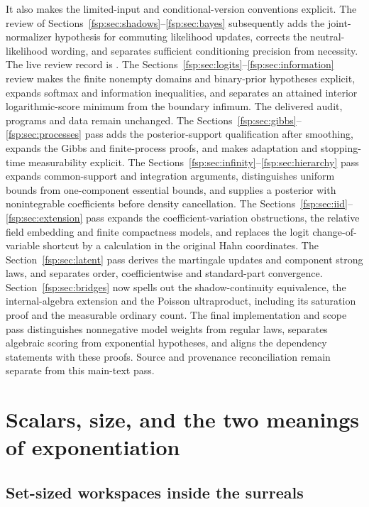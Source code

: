 \documentclass[11pt,a4paper]{article}
\numberwithin{equation}{section}
\theoremstyle{definition}
\theoremstyle{remark}
\begin{document}
It also makes the limited-input and conditional-version conventions explicit.
The review of Sections~\ref{fsp:sec:shadows}--\ref{fsp:sec:bayes}
subsequently adds the joint-normalizer hypothesis for commuting likelihood
updates, corrects the neutral-likelihood wording, and separates sufficient
conditioning precision from necessity. The live review record is
. The Sections~\ref{fsp:sec:logits}--\ref{fsp:sec:information}
review makes the finite nonempty domains and binary-prior hypotheses explicit,
expands softmax and information inequalities, and separates an attained
interior logarithmic-score minimum from the boundary infimum. The delivered
audit, programs and data remain unchanged. The
Sections~\ref{fsp:sec:gibbs}--\ref{fsp:sec:processes} pass adds the
posterior-support qualification after smoothing, expands the Gibbs and
finite-process proofs, and makes adaptation and stopping-time measurability
explicit. The Sections~\ref{fsp:sec:infinity}--\ref{fsp:sec:hierarchy}
pass expands common-support and integration arguments, distinguishes uniform
bounds from one-component essential bounds, and supplies a posterior with
nonintegrable coefficients before density cancellation. The
Sections~\ref{fsp:sec:iid}--\ref{fsp:sec:extension} pass expands the
coefficient-variation obstructions, the relative field embedding and finite
compactness models, and replaces the logit change-of-variable shortcut by
a calculation in the original Hahn coordinates. The
Section~\ref{fsp:sec:latent} pass derives the martingale updates and
component strong laws, and separates order, coefficientwise and
standard-part convergence. Section~\ref{fsp:sec:bridges} now spells out
the shadow-continuity equivalence, the internal-algebra extension and the
Poisson ultraproduct, including its saturation proof and the measurable
ordinary count. The final implementation and scope pass distinguishes
nonnegative model weights from regular laws, separates algebraic scoring
from exponential hypotheses, and aligns the dependency statements with
these proofs. Source and provenance reconciliation remain separate from
this main-text pass.

\section{Scalars, size, and the two meanings of exponentiation}
\label{fsp:sec:scalars}

\subsection{Set-sized workspaces inside the surreals}
\end{document}
